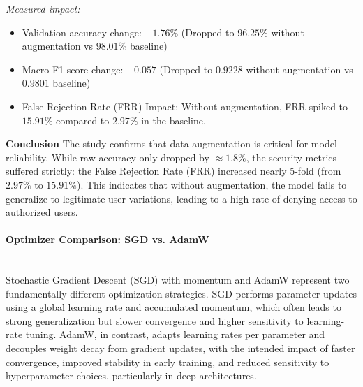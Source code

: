 \documentclass[12pt,a4paper]{article}
\begin{document}
\textit{Measured impact:}
\begin{itemize}
    \item Validation accuracy change:
     $-1.76\%$ (Dropped to $96.25\%$ without augmentation vs $98.01\%$ baseline)
    \item Macro F1-score change: $-0.057$ (Dropped to $0.9228$ without augmentation vs $0.9801$ baseline)
    \item False Rejection Rate (FRR) Impact: Without augmentation, FRR spiked to $15.91\%$ compared to $2.97\%$ in the baseline.
\end{itemize}
\textbf{Conclusion}
The study confirms that data augmentation is critical for model reliability.
While raw accuracy only dropped by $\approx 1.8\%$, the security metrics suffered strictly:
the False Rejection Rate (FRR) increased nearly 5-fold (from $2.97\%$ to $15.91\%$). This indicates that without augmentation, the model fails to generalize to legitimate user variations, leading to a high rate of denying access to authorized users.


\paragraph{Optimizer Comparison: SGD vs. AdamW} \mbox{} \\
Stochastic Gradient Descent (SGD) with momentum and AdamW represent two fundamentally different optimization strategies. SGD performs parameter updates using a global learning rate and accumulated momentum, which often leads to strong generalization but slower convergence and higher sensitivity to learning-rate tuning. AdamW, in contrast, adapts learning rates per parameter and decouples weight decay from gradient updates, with the intended impact of faster convergence, improved stability in early training, and reduced sensitivity to hyperparameter choices, particularly in deep architectures.
\end{document}

